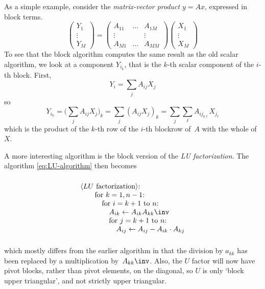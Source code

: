 As a simple example, consider the
\emph{matrix-vector product}
$y=Ax$, expressed in block terms.
\[ 
\begin{pmatrix}
  Y_1\\ \vdots\\ Y_M
\end{pmatrix}=
\begin{pmatrix}
  A_{11}&\ldots&A_{1M}\\ \vdots&&\vdots\\ A_{M1}&\ldots&A_{MM}
\end{pmatrix}
\begin{pmatrix}
  X_1\\ \vdots\\ X_M
\end{pmatrix}
\]
To see that the block algorithm computes the same result as the old
scalar algorithm, we look at a component $Y_{i_k}$, that is the $k$-th
scalar component of the $i$-th block. First,
\[ Y_i=\sum_j A_{ij}X_j \]
so 
\[
  Y_{i_k}=\bigl(\sum_j A_{ij}X_j\bigr)_k=
  \sum_j \left(A_{ij}X_j\right)_k=\sum_j\sum_\ell A_{ij_{k\ell}}X_{j_\ell}
\]
which is the product of the $k$-th row of the $i$-th blockrow of~$A$
with the whole of~$X$.

A more interesting algorithm is the block version of the
\emph{LU factorization}.
The algorithm \eqref{eq:LU-algorithm} then becomes
\begin{equation}
 \vcenter{%
\begin{tabbing}
  \kern20pt\=\kern10pt\=\kern10pt\=\kern10pt\=\kill
  \macro{$LU$ factorization}:\\
  \>for $k=1,n-1$:\\
  \>\>for $i=k+1$ to $n$:\\
  \>\>\> $A_{ik}\leftarrow A_{ik}A_{kk}\inv$\\
  \>\>\>for $j=k+1$ to $n$:\\
  \>\>\>\>$A_{ij}\leftarrow A_{ij}-A_{ik}\cdot A_{kj}$
\end{tabbing}
  }
\label{eq:LU-block-algorithm}
\end{equation}
which mostly differs from the earlier algorithm in that the division
by $a_{kk}$ has been replaced by a multiplication
by~$A_{kk}\inv$. Also, the $U$ factor will now have pivot blocks,
rather than pivot elements, on the diagonal, so $U$ is only `block
upper triangular', and not strictly upper triangular.


